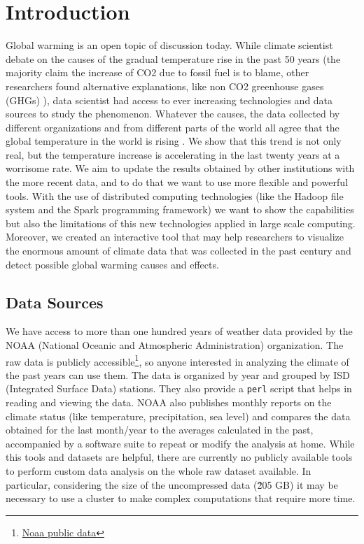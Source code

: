 \documentclass{vldb}
\begin{document}
\maketitle

\begin{abstract}


\end{abstract}

\section{Introduction}
\label{sec:intro}
Global warming is an open topic of discussion today. While climate scientist debate on the causes of the gradual temperature rise in the past 50 years (the majority claim the increase of CO2 due to fossil fuel is to blame, other researchers found alternative explanations, like non CO2 greenhouse gases (GHGs) \cite{hansen2000global}), data scientist had access to ever increasing technologies and data sources to study the phenomenon. Whatever the causes, the data collected by different organizations and from different parts of the world all agree that the global temperature in the world is rising \cite{hansen2006global}. We show that this trend is not only real, but the temperature increase is accelerating in the last twenty years at a worrisome rate. We aim to update the results obtained by other institutions with the more recent data, and to do that we want to use more flexible and powerful tools. With the use of distributed computing technologies (like the Hadoop file system and the Spark programming framework) we want to show the capabilities but also the limitations of this new technologies applied in large scale computing. Moreover, we created an interactive tool that may help researchers to visualize the enormous amount of climate data that was collected in the past century and detect possible global warming causes and effects.

\subsection{Data Sources}
We have access to more than one hundred years of weather data provided by the NOAA (National Oceanic and Atmospheric Administration) organization. The raw data is publicly accessible\footnote{\href{ftp://ftp.ncdc.noaa.gov/pub/data/noaa/}{Noaa public data}}, so anyone interested in analyzing the climate of the past years can use them. The data is organized by year and grouped by ISD (Integrated Surface Data) stations. They also provide a \texttt{perl} script that helps in reading and viewing the data. NOAA also publishes monthly reports on the climate status (like temperature, precipitation, sea level) and compares the data obtained for the last month/year to the averages calculated in the past, accompanied by a software suite to repeat or modify the analysis at home. While this tools and datasets are helpful, there are currently no publicly available tools to perform custom data analysis on the whole raw dataset available. In particular, considering the size of the uncompressed data (\~205 GB) it may be necessary to use a cluster to make complex computations that require more time. \\
\end{document}
